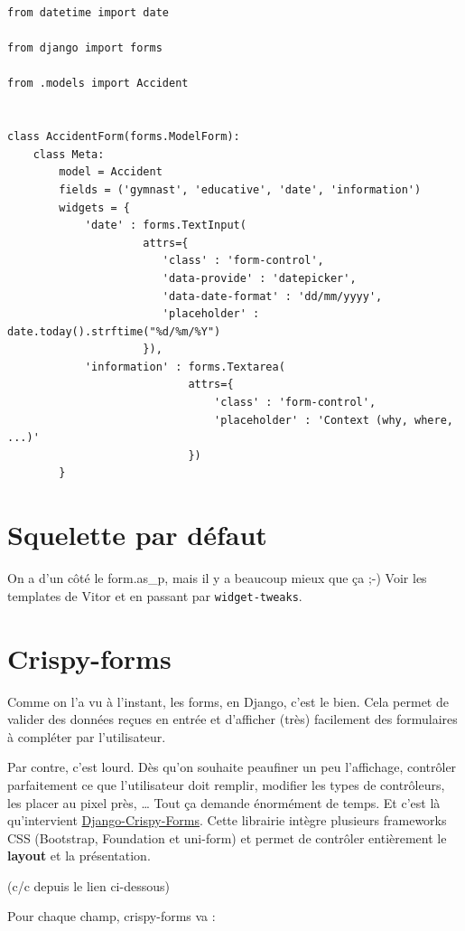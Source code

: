\documentclass[11pt]{amsbook}
\begin{document}
\begin{verbatim}
from datetime import date

from django import forms

from .models import Accident


class AccidentForm(forms.ModelForm):
    class Meta:
        model = Accident
        fields = ('gymnast', 'educative', 'date', 'information')
        widgets = {
            'date' : forms.TextInput(
                     attrs={
                        'class' : 'form-control',
                        'data-provide' : 'datepicker',
                        'data-date-format' : 'dd/mm/yyyy',
                        'placeholder' : date.today().strftime("%d/%m/%Y")
                     }),
            'information' : forms.Textarea(
                            attrs={
                                'class' : 'form-control',
                                'placeholder' : 'Context (why, where, ...)'
                            })
        }
\end{verbatim}

\hypertarget{x-squelette-par-défaut}{\section{Squelette par défaut}}
On a d’un côté le form.as\_p, mais il y a beaucoup mieux que ça ;-) Voir les templates de Vitor et en passant par \texttt{widget-tweaks}.


\hypertarget{x-crispy-forms}{\section{Crispy-forms}}
Comme on l’a vu à l’instant, les forms, en Django, c’est le bien. Cela permet de valider des données reçues en entrée et d’afficher (très) facilement des formulaires à compléter par l’utilisateur.


Par contre, c’est lourd. Dès qu’on souhaite peaufiner un peu l’affichage, contrôler parfaitement ce que l’utilisateur doit remplir, modifier les types de contrôleurs, les placer au pixel près, …​ Tout ça demande énormément de temps. Et c’est là qu’intervient \href{http://django-crispy-forms.readthedocs.io/en/latest/}{Django-Crispy-Forms}. Cette librairie intègre plusieurs frameworks CSS (Bootstrap, Foundation et uni-form) et permet de contrôler entièrement le \textbf{layout} et la présentation.


(c/c depuis le lien ci-dessous)


Pour chaque champ, crispy-forms va :
\end{document}
